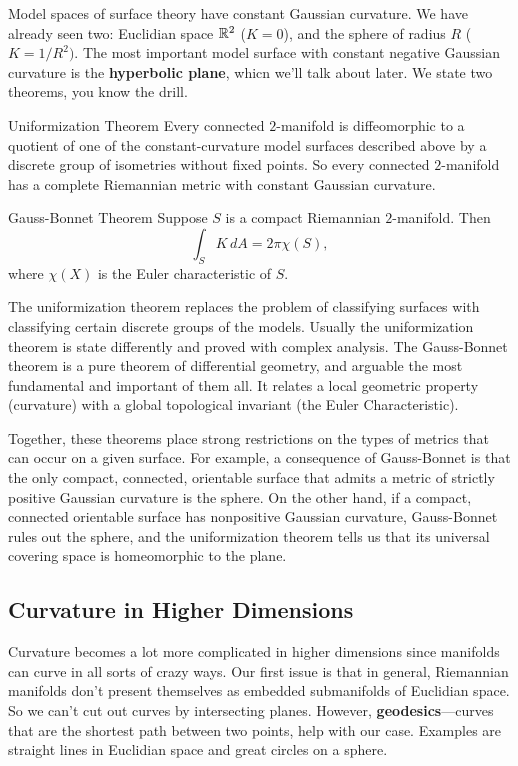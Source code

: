 Model spaces of surface theory have constant Gaussian curvature. We have already seen two: Euclidian space $\mathbb{R}^2$ ($K=0$), and the sphere of radius $R$ ($K= 1/R^2)$. The most important model surface with constant negative Gaussian curvature is the \textbf{hyperbolic plane}, whicn we'll talk about later. We state two theorems, you know the drill.
\begin{namedthm}{Uniformization Theorem}
    Every connected $2$-manifold is diffeomorphic to a quotient of one of the constant-curvature model surfaces described above by a discrete group of isometries without fixed points. So every connected $2$-manifold has a complete Riemannian metric with constant Gaussian curvature.
\end{namedthm}
\begin{namedthm}{Gauss-Bonnet Theorem}
   Suppose $S$ is a compact Riemannian $2$-manifold. Then \[
       \int_{S}^{} K \, dA= 2\pi \chi (S),
   \] where $\chi(X)$ is the Euler characteristic of $S$. 
\end{namedthm}
The uniformization theorem replaces the problem of classifying surfaces with classifying certain discrete groups of the models. Usually the uniformization theorem is state differently and proved with complex analysis. The Gauss-Bonnet theorem is a pure theorem of differential geometry, and arguable the most fundamental and important of them all. It relates a local geometric property (curvature) with a global topological invariant (the Euler Characteristic).

Together, these theorems place strong restrictions on the types of metrics that can occur on a given surface. For example, a consequence of Gauss-Bonnet is that the only compact, connected, orientable surface that admits a metric of strictly positive Gaussian curvature is the sphere. On the other hand, if a compact, connected orientable surface has nonpositive Gaussian curvature, Gauss-Bonnet rules out the sphere, and the uniformization theorem tells us that its universal covering space is homeomorphic to the plane.

\subsection{Curvature in Higher Dimensions}
Curvature becomes a lot more complicated in higher dimensions since manifolds can curve in all sorts of crazy ways. Our first issue is that in general, Riemannian manifolds don't present themselves as embedded submanifolds of Euclidian space. So we can't cut out curves by intersecting planes. However, \textbf{geodesics}---curves that are the shortest path between two points, help with our case. Examples are straight lines in Euclidian space and great circles on a sphere.

